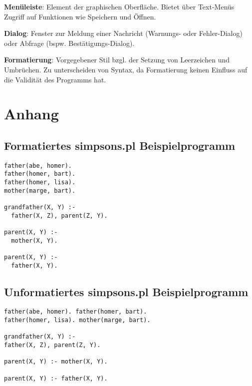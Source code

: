\documentclass[parskip=full,11pt,twoside]{scrartcl}
\begin{document}
\textbf{Menüleiste}:
Element der graphischen Oberfläche. Bietet über Text-Menüs Zugriff auf Funktionen wie Speichern und Öffnen.

\textbf{Dialog}:
Fenster zur Meldung einer Nachricht (Warnungs- oder Fehler-Dialog) oder Abfrage (bspw. Bestätigungs-Dialog).

\textbf{Formatierung}:
\label{format}
Vorgegebener Stil bzgl. der Setzung von Leerzeichen und Umbrüchen. Zu unterscheiden von Syntax, da Formatierung keinen Einfluss auf die Validität des Programms hat.

\newpage
\section{Anhang}

\subsection{Formatiertes simpsons.pl Beispielprogramm}

\begin{lstlisting}
father(abe, homer).
father(homer, bart).
father(homer, lisa).
mother(marge, bart).

grandfather(X, Y) :-
  father(X, Z), parent(Z, Y).

parent(X, Y) :-
  mother(X, Y).

parent(X, Y) :-
  father(X, Y).
\end{lstlisting}

\subsection{Unformatiertes simpsons.pl Beispielprogramm}

\begin{lstlisting}
father(abe, homer). father(homer, bart).
father(homer, lisa). mother(marge, bart).

grandfather(X, Y) :-
father(X, Z), parent(Z, Y).

parent(X, Y) :- mother(X, Y).

parent(X, Y) :- father(X, Y).
\end{lstlisting}
\end{document}
